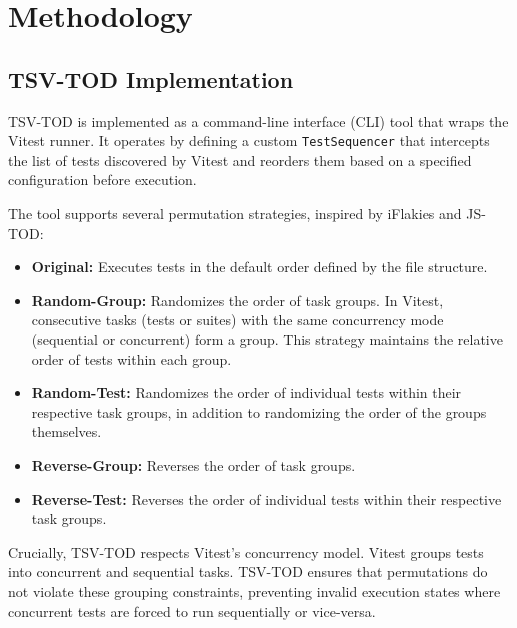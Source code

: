 \documentclass[10pt, conference]{IEEEtran}
\begin{document}
\section{Methodology}

\subsection{TSV-TOD Implementation}
TSV-TOD is implemented as a command-line interface (CLI) tool that wraps the Vitest runner. It operates by defining a custom \texttt{TestSequencer} that intercepts the list of tests discovered by Vitest and reorders them based on a specified configuration before execution.

The tool supports several permutation strategies, inspired by iFlakies and JS-TOD:
\begin{itemize}
    \item \textbf{Original:} Executes tests in the default order defined by the file structure.
    \item \textbf{Random-Group:} Randomizes the order of task groups. In Vitest, consecutive tasks (tests or suites) with the same concurrency mode (sequential or concurrent) form a group. This strategy maintains the relative order of tests within each group.
    \item \textbf{Random-Test:} Randomizes the order of individual tests within their respective task groups, in addition to randomizing the order of the groups themselves.
    \item \textbf{Reverse-Group:} Reverses the order of task groups.
    \item \textbf{Reverse-Test:} Reverses the order of individual tests within their respective task groups.
\end{itemize}

Crucially, TSV-TOD respects Vitest's concurrency model. Vitest groups tests into concurrent and sequential tasks. TSV-TOD ensures that permutations do not violate these grouping constraints, preventing invalid execution states where concurrent tests are forced to run sequentially or vice-versa.
\end{document}

